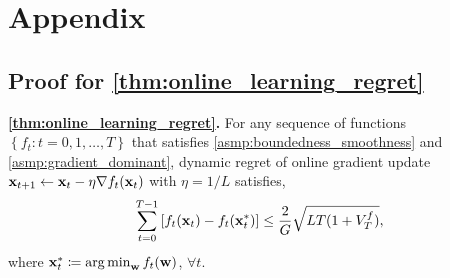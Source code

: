 \section{Appendix}

\subsection{Proof for \cref{thm:online_learning_regret}}

\textbf{\cref{thm:online_learning_regret}.} For any sequence of functions $\left\{ f_t : t = 0, 1, \dots, T \right\}$ that satisfies \cref{asmp:boundedness_smoothness} and \cref{asmp:gradient_dominant}, dynamic regret of online gradient update ${\mathbf{x}}_{t+1} \gets {\mathbf{x}}_{t} - \eta \nabla f_{t}({\mathbf{x}}_{t})$ with $\eta = 1/L$ satisfies,
\begin{equation}
\label{eq:online_learning_regret}
\begin{split}
    \sum\limits_{t=0}^{T-1}{\left[ f_t({\mathbf{x}}_t) - f_t( {\mathbf{x}}_t^*) \right]} \le \frac{2}{G} \sqrt{L T ( 1 + V_T^f )},
\end{split}
\end{equation}
where ${\mathbf{x}}_t^* \coloneqq \operatorname*{arg\,min}_{{\mathbf{w}}}{f_t({\mathbf{w}})}$, $\forall t$.

